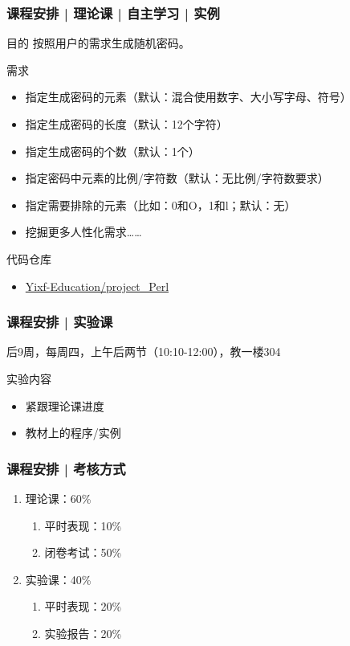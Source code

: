 \begin{frame}
  \frametitle{课程安排 | 理论课 | 自主学习 | 实例}
  \begin{block}{目的}
    按照用户的需求生成随机密码。
  \end{block}
  \pause
  \begin{block}{需求}
    \begin{itemize}
      \item 指定生成密码的元素（默认：混合使用数字、大小写字母、符号）
      \item 指定生成密码的长度（默认：12个字符）
      \item 指定生成密码的个数（默认：1个）
      \item 指定密码中元素的比例/字符数（默认：无比例/字符数要求）
      \item 指定需要排除的元素（比如：0和O，1和l；默认：无）
      \item 挖掘更多人性化需求……
    \end{itemize}
  \end{block}
  \pause
  \begin{block}{代码仓库}
    \begin{itemize}
      \item \href{https://github.com/Yixf-Education/project_Perl}{Yixf-Education/project\_Perl}
    \end{itemize}
  \end{block}
\end{frame}

\begin{frame}
  \frametitle{课程安排 | 实验课}
  \begin{center}
  \alert{后9周，每周四，上午后两节（10:10-12:00），教一楼304}\\
  \vspace{0.2cm}
  \end{center}
  \begin{block}{实验内容}
    \begin{itemize}
      \item 紧跟理论课进度
      \item 教材上的程序/实例
    \end{itemize}
  \end{block}
\end{frame}

\begin{frame}
  \frametitle{课程安排 | 考核方式}
  \begin{enumerate}
    \item 理论课：60\%
      \begin{enumerate}
        \item 平时表现：10\%
        \item 闭卷考试：50\%
      \end{enumerate}
    \item 实验课：40\%
      \begin{enumerate}
        \item 平时表现：20\%
        \item 实验报告：20\%
      \end{enumerate}
  \end{enumerate}
\end{frame}

